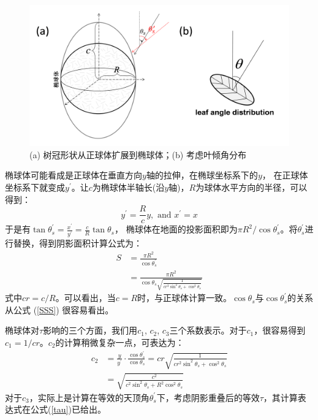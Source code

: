  {
    \begin{figure}[htbp]
    \centering
    \includegraphics[width=0.8\columnwidth]{Figures/辐射过程及辐射通量计算/椭球体树冠.png}
    \caption{(a) 树冠形状从正球体扩展到椭球体；(b) 考虑叶倾角分布}
    \label{fig:椭球体树冠}
    \end{figure}
    }

椭球体可能看成是正球体在垂直方向$y$轴的拉伸，在椭球坐标系下的$y$，
在正球体坐标系下就变成$y^\prime$。让$c$为椭球体半轴长(沿$y$轴)，$R$为球体水平方向的半径，可以得到：
\begin{equation}
y^{\prime}=\frac{R}{c} y, \text { and } x^{\prime}=x
\end{equation}
于是有$\tan{\theta_s^\prime}=\frac{x^\prime}{y^\prime}=\frac{c}{R}{\tan{\theta}}_s$，
椭球体在地面的投影面积即为$\pi R^2/\cos{\theta_s^\prime}$。将$\theta_s^\prime$进行替换，得到阴影面积计算公式为：
\begin{equation}\label{SSS}
\begin{aligned} S &=\frac{\pi R^{2}}{\cos \theta_{s}^{\prime}} \\ &=\frac{\pi R^{2}}{\cos \theta_{s} 
\sqrt{\frac{1}{c r^{2} \sin ^{2} \theta_{s}+\cos ^{2} \theta_{s}}}} \end{aligned}
\end{equation}
式中$cr=c/R$。可以看出，当$c=R$时，与正球体计算一致。$\cos{\theta_s}$与$\cos{\theta_s^\prime}$的关系从公式 (\ref{SSS}) 很容易看出。%


椭球体对$\tau$影响的三个方面，我们用$c_1$, $c_2$, $c_3$三个系数表示。对于$c_1$，很容易得到$c_1=1/cr$。$c_2$的计算稍微复杂一点，可表达为：
\begin{equation}
\begin{aligned} c_2 &=\frac{y}{y^{\prime}} \cdot \frac{\cos \theta_{s}^{\prime}}{\cos \theta_{s}}=
    c r \sqrt{\frac{1}{c r^{2} \sin ^{2} \theta_{s}+\cos ^{2} \theta_{s}}} \\ &=
    \sqrt{\frac{c^{2}}{c^{2} \sin ^{2} \theta_{s}+R^{2} \cos ^{2} \theta_{s}}} \end{aligned}
\end{equation}
对于$c_3$，实际上是计算在等效的天顶角$\theta_s^\prime$下，考虑阴影重叠后的等效$\tau$，其计算表达式在公式(\ref{tau})已给出。

